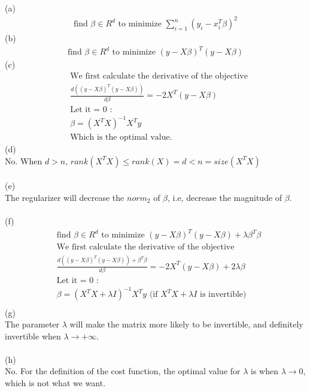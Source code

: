 \documentclass[12pt,letterpaper,fleqn]{hmcpset}
\begin{document}
\begin{problem}
\end{problem}
\begin{solution}
(a)
\begin{align*}
\text{find $\beta \in R^d$ to minimize }\sum_{i=1}^{n}(y_i-x_i^T\beta)^2
\end{align*}
(b)
\begin{align*}
\text{find $\beta \in R^d$ to minimize }(y-X\beta)^T(y-X\beta)
\end{align*}
(c)
\begin{align*}
&\text{We first calculate the derivative of the objective}\\
&\frac{d((y-X\beta)^T(y-X\beta))}{d\beta}=-2X^T(y-X\beta)\\
&\text{Let it = 0 :}\\
&\beta=(X^TX)^{-1}X^Ty\\
&\text{Which is the optimal value.}
\end{align*}
(d)
\\No. When $d>n$, $rank(X^TX)\le rank(X)=d<n=size(X^TX)$
\\\\(e)
\\The regularizer will decrease the $norm_2$ of $\beta$, i.e, decrease the magnitude of $\beta$.
\\\\(f)
\begin{align*}
&\text{find $\beta \in R^d$ to minimize }(y-X\beta)^T(y-X\beta)+\lambda\beta^T\beta\\
&\text{We first calculate the derivative of the objective}\\
&\frac{d((y-X\beta)^T(y-X\beta))+\beta^T\beta}{d\beta}=-2X^T(y-X\beta)+2\lambda\beta\\
&\text{Let it = 0 :}\\
&\beta=(X^TX+\lambda I)^{-1}X^Ty \text{ (if } X^TX+\lambda I \text{ is invertible)}\\
\end{align*}
(g)
\\The parameter $\lambda$ will make the matrix more likely to be invertible, and definitely invertible when $\lambda\to +\infty$.
\\\\(h)
\\No. For the definition of the cost function, the optimal value for $\lambda$ is when $\lambda\to 0$, which is not what we want.
\end{solution}
\end{document}
